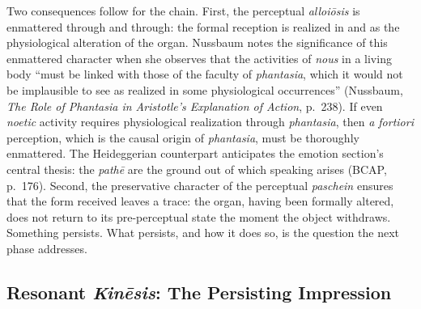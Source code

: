 \documentclass{article}
\begin{document}
Two consequences follow for the chain. First, the perceptual \textit{alloiōsis} is enmattered through and through: the formal reception is realized in and as the physiological alteration of the organ. Nussbaum notes the significance of this enmattered character when she observes that the activities of \textit{nous} in a living body ``must be linked with those of the faculty of \textit{phantasia}, which it would not be implausible to see as realized in some physiological occurrences'' (Nussbaum, \textit{The Role of Phantasia in Aristotle's Explanation of Action}, p.~238). If even \textit{noetic} activity requires physiological realization through \textit{phantasia}, then \textit{a fortiori} perception, which is the causal origin of \textit{phantasia}, must be thoroughly enmattered. The Heideggerian counterpart anticipates the emotion section's central thesis: the \textit{pathē} are the ground out of which speaking arises (BCAP, p.~176). Second, the preservative character of the perceptual \textit{paschein} ensures that the form received leaves a trace: the organ, having been formally altered, does not return to its pre-perceptual state the moment the object withdraws. Something persists. What persists, and how it does so, is the question the next phase addresses.

\subsection{Resonant \textit{Kinēsis}: The Persisting Impression}
\end{document}
